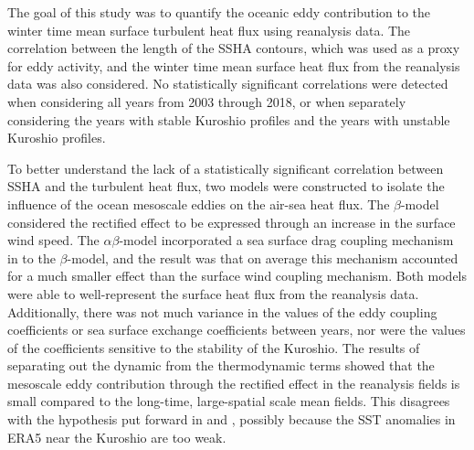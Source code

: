 
The goal of this study was to quantify the oceanic eddy contribution to the winter time mean surface turbulent heat flux using reanalysis data. The correlation between the length of the SSHA contours, which was used as a proxy for eddy activity, and the winter time mean surface heat flux from the reanalysis data was also considered. No statistically significant correlations were detected when considering all years from 2003 through 2018, or when separately considering the years with stable Kuroshio profiles and the years with unstable Kuroshio profiles.\par 

To better understand the lack of a statistically significant correlation between SSHA and the turbulent heat flux, two models were constructed to isolate the influence of the ocean mesoscale eddies on the air-sea heat flux. The $\beta$-model considered the rectified effect to be expressed through an increase in the surface wind speed. The $\alpha\beta$-model incorporated a sea surface drag coupling mechanism in to the $\beta$-model, and the result was that on average this mechanism accounted for a much smaller effect than the surface wind coupling mechanism. Both models were able to well-represent the surface heat flux from the reanalysis data. Additionally, there was not much variance in the values of the eddy coupling coefficients or sea surface exchange coefficients between years, nor were the values of the coefficients sensitive to the stability of the Kuroshio. The results of separating out the dynamic from the thermodynamic terms showed that the mesoscale eddy contribution through the rectified effect in the reanalysis fields is small compared to the long-time, large-spatial scale mean fields. This disagrees with the hypothesis put forward in \citet{ma2016western} and \citet{ma2017revised}, possibly because the SST anomalies in ERA5 near the Kuroshio are too weak.\par 
